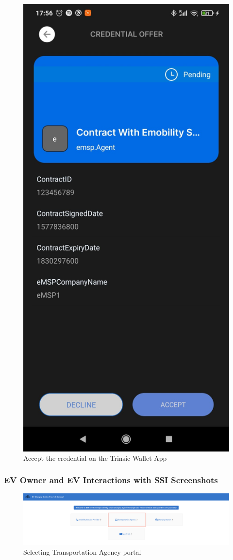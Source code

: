 \begin{figure}[H]
    \centering
    \includegraphics[width=0.4\linewidth]{images/Frontend/eMSP/Screenshot4.jpeg}
    \caption[]{Accept the credential on the Trinsic Wallet App}
    \label{fig:service_provider_screenshot_4}
\end{figure}

\newpage

\subsubsection{EV Owner and EV Interactions with SSI Screenshots}
\label{subapp:ev_owner_and_ev_interactions}

\begin{figure}[H]
    \centering
    \includegraphics[width=\linewidth]{images/Frontend/Transportation_agency/Screenshot1.png}
    \caption[]{Selecting Transportation Agency portal}
    \label{fig:ev_owner_screenshot_1}
\end{figure}

